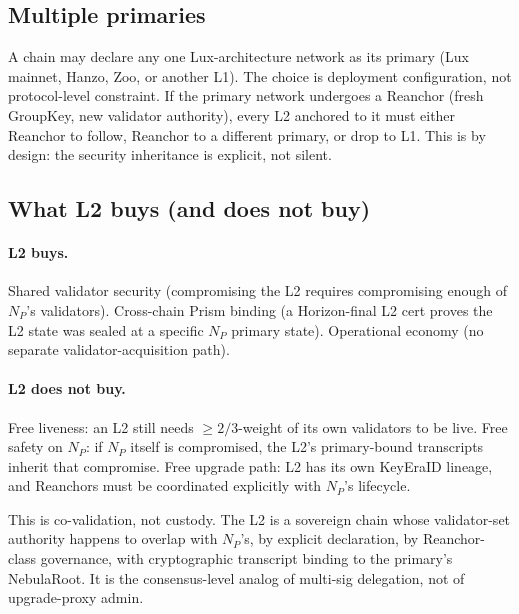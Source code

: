 \subsection{Multiple primaries}

A chain may declare any one Lux-architecture network as its primary (Lux mainnet, Hanzo, Zoo, or another L1). The choice is deployment configuration, not protocol-level constraint. If the primary network undergoes a Reanchor (fresh GroupKey, new validator authority), every L2 anchored to it must either Reanchor to follow, Reanchor to a different primary, or drop to L1. This is by design: the security inheritance is explicit, not silent.

\subsection{What L2 buys (and does not buy)}

\paragraph{L2 buys.} Shared validator security (compromising the L2 requires compromising enough of $N_P$'s validators). Cross-chain Prism binding (a Horizon-final L2 cert proves the L2 state was sealed at a specific $N_P$ primary state). Operational economy (no separate validator-acquisition path).

\paragraph{L2 does not buy.} Free liveness: an L2 still needs $\geq 2/3$-weight of its own validators to be live. Free safety on $N_P$: if $N_P$ itself is compromised, the L2's primary-bound transcripts inherit that compromise. Free upgrade path: L2 has its own KeyEraID lineage, and Reanchors must be coordinated explicitly with $N_P$'s lifecycle.

This is co-validation, not custody. The L2 is a sovereign chain whose validator-set authority happens to overlap with $N_P$'s, by explicit declaration, by Reanchor-class governance, with cryptographic transcript binding to the primary's NebulaRoot. It is the consensus-level analog of multi-sig delegation, not of upgrade-proxy admin.

